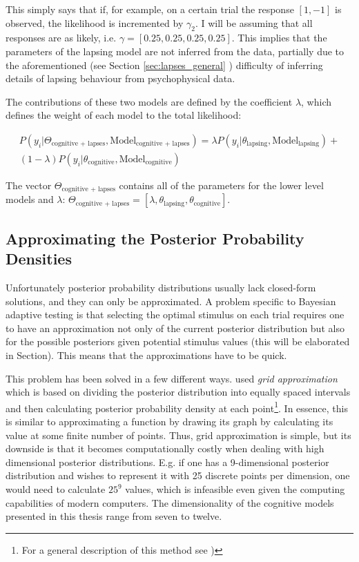 \documentclass{article}\usepackage{knitr}
\begin{document}
This simply says that if, for example, on a certain trial the response $[1,-1]$ is observed, the likelihood is incremented by $\gamma_2$. I will be assuming that all responses are as likely, i.e. $\gamma = [0.25, 0.25, 0.25, 0.25]$. This implies that the parameters of the lapsing model are not inferred from the data, partially due to the aforementioned (see Section \ref{sec:lapses_general} \textit{}) difficulty of inferring details of lapsing behaviour from psychophysical data. 

The contributions of these two models are defined by the coefficient $\lambda$, which defines the weight of each model to the total likelihood:

\begin{multline}
\label{eq:lower_level_hiera}
P(y_i |\Theta_{\text{cognitive + lapses}}, \text{Model}_{\text{cognitive + lapses}}) = \lambda P(y_i | \theta_{\text{lapsing}}, \text{Model}_{\text{lapsing}}) + \\ (1 - \lambda) P(y_i | \theta_{\text{cognitive}}, \text{Model}_{\text{cognitive}})
\end{multline}

The vector $\Theta_{\text{cognitive + lapses}}$ contains all of the parameters for the lower level models and $\lambda$: $\Theta_{\text{cognitive + lapses}} = [\lambda, \theta_{\text{lapsing}}, \theta_{\text{cognitive}}]$.

\subsection{Approximating the Posterior Probability Densities}
\label{sec:posterior_approx}

Unfortunately posterior probability distributions usually lack closed-form solutions, and they can only be approximated. A problem specific to Bayesian adaptive testing is that selecting the optimal stimulus on each trial requires one to have an approximation not only of the current posterior distribution but also for the possible posteriors given potential stimulus values (this will be elaborated in Section). This means that the approximations have to be quick. 

This problem has been solved in a few different ways. \citet{kontsevichtyler1999} used \textit{grid approximation} which is based on dividing the posterior distribution into equally spaced intervals and then calculating posterior probability density at each point\footnote{For a general description of this method see \citealt[p.144]{kruschke2015})}. In essence, this is similar to approximating a function by drawing its graph by calculating its value at some finite number of points. Thus, grid approximation is simple, but its downside is that it becomes computationally costly when dealing with high dimensional posterior distributions. E.g. if one has a 9-dimensional posterior distribution and wishes to represent it with 25 discrete points per dimension, one would need to calculate $25^9$ values, which is infeasible even given the computing capabilities of modern computers. The dimensionality of the cognitive models presented in this thesis range from seven to twelve.
\end{document}
